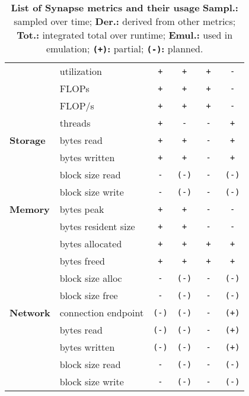 \documentclass[10pt, conference, compsocconf]{IEEEtran}
\newcommand{\B}[1]{\textbf{#1}\xspace}
\newcommand{\T}[1]{\texttt{#1}\xspace}
\newcommand{\synapse}{Synapse\xspace}
\begin{document}
\begin{table}[t]
\begin{center}
\begin{tabular}{llcccc}
                 & utilization             &  \T{ + } &   \T{ + } &  \T{ + } &  \T{ - } \\
                 & FLOPs                   &  \T{ + } &   \T{ + } &  \T{ + } &  \T{ - } \\
                 & FLOP/s                  &  \T{ + } &   \T{ + } &  \T{ + } &  \T{ - } \\
                 & threads                 &  \T{ + } &   \T{ - } &  \T{ - } &  \T{ + } \\\midrule
    \B{Storage}  & bytes read              &  \T{ + } &   \T{ + } &  \T{ - } &  \T{ + } \\
                 & bytes written           &  \T{ + } &   \T{ + } &  \T{ - } &  \T{ + } \\
                 & block size read         &  \T{ - } &   \T{(-)} &  \T{ - } &  \T{(-)} \\
                 & block size write        &  \T{ - } &   \T{(-)} &  \T{ - } &  \T{(-)} \\\midrule
    \B{Memory}   & bytes peak              &  \T{ + } &   \T{ + } &  \T{ - } &  \T{ - } \\
                 & bytes resident size     &  \T{ + } &   \T{ + } &  \T{ - } &  \T{ - } \\
                 & bytes allocated         &  \T{ + } &   \T{ + } &  \T{ + } &  \T{ + } \\
                 & bytes freed             &  \T{ + } &   \T{ + } &  \T{ + } &  \T{ + } \\
                 & block size alloc        &  \T{ - } &   \T{(-)} &  \T{ - } &  \T{(-)} \\
                 & block size free         &  \T{ - } &   \T{(-)} &  \T{ - } &  \T{(-)} \\\midrule
    \B{Network}  & connection endpoint     &  \T{(-)} &   \T{(-)} &  \T{ - } &  \T{(+)} \\
                 & bytes read              &  \T{(-)} &   \T{(-)} &  \T{ - } &  \T{(+)} \\
                 & bytes written           &  \T{(-)} &   \T{(-)} &  \T{ - } &  \T{(+)} \\
                 & block size read         &  \T{ - } &   \T{(-)} &  \T{ - } &  \T{(-)} \\
                 & block size write        &  \T{ - } &   \T{(-)} &  \T{ - } &  \T{(-)} \\\midrule
   \end{tabular}
   \caption{
       \B{List of \synapse metrics and their usage}\newline
       \B{Sampl.:} sampled over time;
       \B{Der.:} derived from other metrics;\newline
       \B{Tot.:} integrated total over runtime;
       \B{Emul.:} used in emulation;\newline
       \B{\T{(+)}:} partial;
       \B{\T{(-)}:} planned.
       \label{tab:metrics}
   }
  \end{center}
 \end{table}
\end{document}
